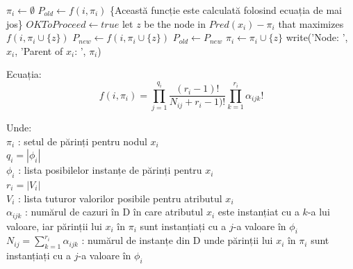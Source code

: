 \begin{algorithm}[H]
	 {
		$\pi_i \leftarrow \emptyset$\;
		$P_{old} \leftarrow f(i, \pi_i)$ \{Această funcție este calculată folosind ecuația de mai jos\}\;
		$OKToProceed \leftarrow true$\;
		 {
			let $z$ be the node in $Pred(x_i) - \pi_i$ that maximizes $f(i, \pi_i \cup \{z\})$\;
			$P_{new} \leftarrow f(i, \pi_i \cup \{z\})$\;
			 {
				$P_{old} \leftarrow P_{new}$\;
				$\pi_i \leftarrow \pi_i \cup \{z\}$\;
			}
		}
		write('Node: ', $x_i$, 'Parent of $x_i$: ', $\pi_i$)\;
	}
\end{algorithm}

Ecuația:
\[
	f(i, \pi_i) = \prod_{j=1}^{q_i} \frac{(r_i-1)!}{N_{ij}+r_i-1)!} \prod_{k=1}^{r_i} \alpha_{ijk}!
\]

Unde: \\
$\pi_i$ : setul de părinți pentru nodul $x_i$ \\
$q_i = |\phi_i|$ \\
$\phi_i$ : lista posibilelor instanțe de părinți pentru $x_i$ \\
$r_i = |V_i|$ \\
$V_i$ : lista tuturor valorilor posibile pentru atributul $x_i$ \\
$\alpha_{ijk}$ : numărul de cazuri în D în care atributul $x_i$ este instanțiat cu a $k$-a lui valoare, iar părinții lui $x_i$ în $\pi_i$ sunt instanțiați cu a $j$-a valoare în $\phi_i$ \\
$N_{ij} = \sum_{k=1}^{r_i} \alpha_{ijk}$ : numărul de instanțe din D unde părinții lui $x_i$ în $\pi_i$ sunt instanțiați cu a $j$-a valoare în $\phi_i$

